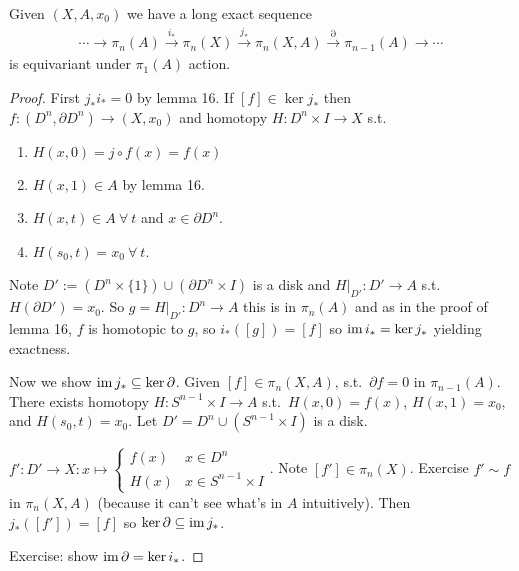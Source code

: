 \documentclass[12pt,class=article,crop=false]{standalone}
\begin{document}
\begin{thm}
Given $ (X,A,x_0)$ we have a long exact sequence
\begin{align*}
	\cdots \to \pi_n(A) \xrightarrow{ i_*} \pi_n(X) \xrightarrow{ j_*} \pi_n(X,A) \xrightarrow{ \partial } \pi_{n-1}(A) \to \cdots
\end{align*}
is equivariant under $ \pi_1(A)$ action.
\end{thm}
\begin{proof}
	First $ j_* i_* = 0$ by lemma 16. If  $ [f] \in \ker j_*$ then $ f:(D^{n}, \partial D^{n})\to (X,x_0)$ and homotopy $ H: D^{n} \times I \to X$ s.t.\ 
	\begin{enumerate}[label=(\arabic*)]
		\item $ H(x,0) = j \circ f(x)= f(x)$
		\item $ H(x,1) \in A$ by lemma 16.
		\item $ H(x,t) \in A \ \forall \ t$ and $ x \in \partial D^{n}$.
		\item $ H(s_0,t) = x_0 \ \forall \ t$.
	\end{enumerate}
	Note $ D' := (D^{n} \times \{1\} ) \cup  (\partial D^{n} \times I)$ is a disk and $ H|_{D'}: D' \to A$ s.t.\ $ H( \partial D') = x_0$. So $ g = H|_{D'}: D^{n} \to A$ this is in $ \pi_n(A)$ and as in the proof of lemma 16, $ f$ is homotopic to $ g$, so  $ i_*([g]) = [f]$ so  $ \operatorname{im} i_* = \ker j_*$ yielding exactness.

	Now we show $ \operatorname{im} j_* \subseteq \ker \partial $. Given $ [f] \in \pi_n(X,A)$, s.t.\ $ \partial f =0$ in $ \pi_{n-1}(A)$. There exists homotopy $ H: S^{n-1} \times I \to A$ s.t.\ $ H(x,0) =f(x)$, $ H(x,1) = x_0$, and $ H(s_0,t) = x_0$. Let $ D' = D^{n} \cup (S^{n-1} \times I)$ is a disk.

	$ f': D' \to X: x\mapsto \begin{cases}
		f(x) & x \in D^{n}\\
		H(x) & x \in S^{n-1} \times I
	\end{cases}$.
	Note $ [f'] \in \pi_n(X)$. Exercise $ f' \sim f $ in $ \pi_n(X,A)$ (because it can't see what's in $ A$ intuitively). Then $ j_*([f']) = [f]$ so  $ \ker \partial \subseteq \operatorname{im} j_*$. 

	Exercise: show $ \operatorname{im} \partial  = \ker i_*$.
\end{proof}
\end{document}
